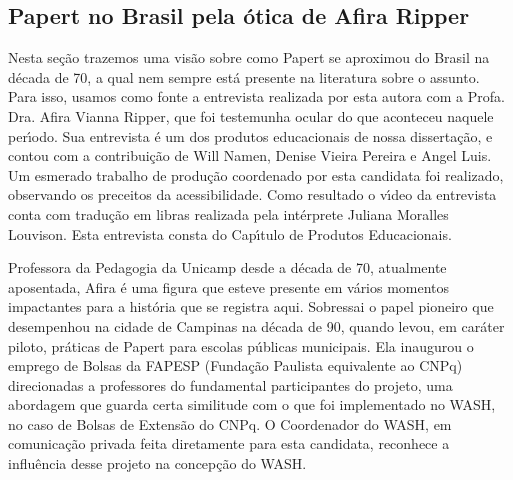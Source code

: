 \documentclass[
12pt,		%
openright,	%
twoside,  %
a4paper,			%
chapter=TITLE,		%
english,			%
french,				%
spanish,			%
brazil				%
]{USPSC-classe/USPSC}
\begin{document}
\subsection[Papert no Brasil pela \'otica de Afira Ripper]{Papert no Brasil pela \'otica de Afira Ripper}\label{Papert no Brasil pela \'otica de Afira Ripper}
Nesta se\c{c}\~ao trazemos uma vis\~ao sobre como Papert se aproximou do Brasil na d\'ecada de 70, a qual nem sempre est\'a presente na literatura sobre o assunto. Para isso, usamos como fonte a entrevista realizada por esta autora com a Profa. Dra. Afira Vianna Ripper, que foi testemunha ocular do que aconteceu naquele per\'{\i}odo. Sua entrevista \'e um dos produtos educacionais de nossa disserta\c{c}\~ao, e contou com a contribui\c{c}\~ao de Will Namen, Denise Vieira Pereira e Angel Luis. Um esmerado trabalho de produ\c{c}\~ao coordenado por esta candidata foi realizado, observando os preceitos da acessibilidade. Como resultado o v\'{\i}deo da entrevista conta com tradu\c{c}\~ao em libras realizada pela int\'erprete Juliana Moralles Louvison. Esta entrevista consta do Cap\'{\i}tulo de Produtos Educacionais.

















Professora da Pedagogia da Unicamp desde a d\'ecada de 70, atualmente aposentada, Afira \'e uma figura que esteve presente em v\'arios momentos impactantes para a hist\'oria que se registra aqui. Sobressai o papel pioneiro que  desempenhou na cidade de Campinas na d\'ecada de 90, quando levou, em car\'ater piloto, pr\'aticas de Papert para escolas p\'ublicas municipais. Ela inaugurou o emprego de Bolsas da FAPESP (Funda\c{c}\~ao Paulista equivalente ao CNPq) direcionadas a professores do fundamental participantes do projeto, uma abordagem que guarda certa similitude com o que foi implementado no WASH, no caso de Bolsas de Extens\~ao do CNPq. O Coordenador do WASH, em comunica\c{c}\~ao privada feita diretamente para esta candidata, reconhece a influ\^encia desse projeto na concep\c{c}\~ao do WASH.
\end{document}
